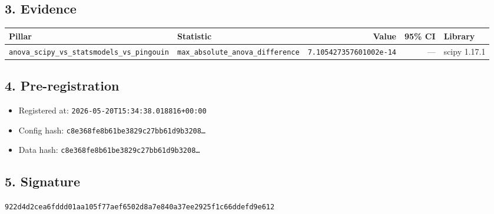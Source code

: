 \documentclass{article}
\begin{document}
\subsection*{3. Evidence}
\begin{tabular}{llrrl}\toprule
\textbf{Pillar} & \textbf{Statistic} & \textbf{Value} & \textbf{95\% CI} & \textbf{Library} \\\midrule
\texttt{anova\_scipy\_vs\_statsmodels\_vs\_pingouin} & \texttt{max\_absolute\_anova\_difference} & \texttt{7.105427357601002e-14} & --- & scipy 1.17.1 \\
\bottomrule\end{tabular}
\subsection*{4. Pre-registration}
\begin{itemize}
\item Registered at: \texttt{2026-05-20T15:34:38.018816+00:00}
\item Config hash: \texttt{c8e368fe8b61be3829c27bb61d9b3208\dots}
\item Data hash: \texttt{c8e368fe8b61be3829c27bb61d9b3208\dots}
\end{itemize}
\subsection*{5. Signature}
\texttt{922d4d2cea6fddd01aa105f77aef6502d8a7e840a37ee2925f1c66ddefd9e612}\\
\end{document}
